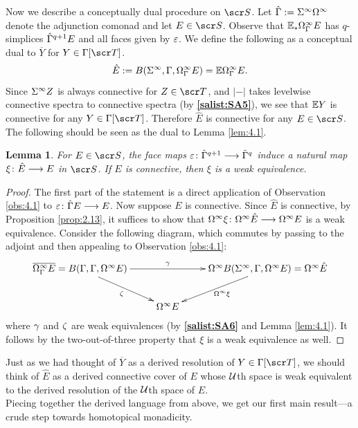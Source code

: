 \documentclass{amsart}
\newtheorem{lem}[thm]{Lemma}
\theoremstyle{definition}
\begin{document}
Now we describe a conceptually dual procedure on $\sS$. Let $\hat{\Gamma} := \Sigma^{\infty} \Omega^{\infty}$ denote the adjunction comonad and let $E \in \sS$. Observe that $\mathbb{E}_*\Omega^{\infty}_{\Gamma}E$ has $q$-simplices $\hat{\Gamma}^{q+1}E$ and all faces given by $\varepsilon$. We define the following as a conceptual dual to $\overline{Y}$ for $Y \in \GA[\sT]$.
\[\hat{E} := B(\Sigma^{\infty},\Gamma,\Omega^{\infty}_{\Gamma}E) = \mathbb{E} \Omega^{\infty}_{\Gamma} E.\]
\noindent Since $\Sigma^{\infty}Z$ is always connective for $Z \in \sT$, and $|-|$ takes levelwise connective spectra to connective spectra (by \textbf{\ref{salist:SA5}}), we see that $\mathbb{E} Y$ is connective for any $Y \in \GA[\sT]$. 
Therefore $\hat{E}$ is connective for any $E \in \sS$. The following should be seen as the dual to Lemma \ref{lem:4.1}.
\begin{lem}\label{lem:4.3}
    For $E \in \sS$, the face maps $\varepsilon \colon \hat{\Gamma}^{q+1} \longrightarrow \hat{\Gamma}^q$ induce a natural map $\xi \colon \hat{E} \longrightarrow E$ in $\sS$. If $E$ is connective, then $\xi$ is a weak equivalence.
\end{lem}
\begin{proof}
    The first part of the statement is a direct application of Observation \ref{obs:4.1} to $\varepsilon \colon \hat{\Gamma}E \longrightarrow E$. Now suppose $E$ is connective. Since $\hat{E}$ is connective, by Proposition \ref{prop:2.13}, it suffices to show that $\Omega^{\infty}\xi \colon \Omega^{\infty}\hat{E} \longrightarrow \Omega^{\infty} E$ is a weak equivalence. Consider the following diagram, which commutes by passing to the adjoint and then appealing to Observation \ref{obs:4.1}:
    \[
    \xymatrix{
        \overline{\OM^{\infty}_{\GA} E} = B(\GA,\GA,\OM^{\infty}E) \ar[dr]_{\ze} \ar[rr]^-{\ga} & & \OM^{\infty} B(\SI^{\infty},\GA,\OM^{\infty}E) = \OM^{\infty} \hat{E} \ar[dl]^{\OM^{\infty}\xi}\\
        & \OM^{\infty}E & 
    }
    \]
    \noindent where $\gamma$ and $\zeta$ are weak equivalences (by \textbf{\ref{salist:SA6}} and Lemma \ref{lem:4.1}). It follows by the two-out-of-three property that $\xi$ is a weak equivalence as well.
\end{proof}
\noindent Just as we had thought of $\overline{Y}$ as a derived resolution of $Y \in \GA[\sT]$, we should think of $\hat{E}$ as a derived connective cover of $E$ whose ${\mathcal{U}}$th space is weak equivalent to the derived resolution of the ${\mathcal{U}}$th space of $E$.\\

Piecing together the derived language from above, we get our first main result---a crude step towards homotopical monadicity.
\end{document}
